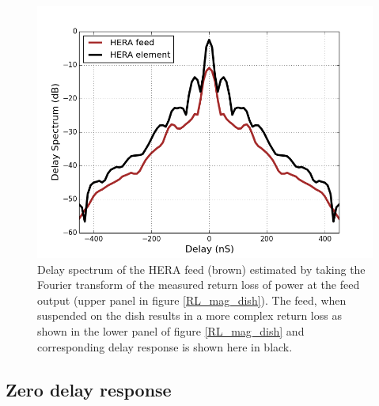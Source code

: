 \documentclass[twocolumn]{emulateapj}
\begin{document}
    \begin{figure}       
    \centering
    \includegraphics[width=\linewidth]{GB_reflectometry_part3/plot/ds_feed_dish.png}
    \caption{Delay spectrum of the HERA feed (brown) estimated by taking the Fourier transform of the measured return loss of power at the feed output (upper panel in figure \ref{RL_mag_dish}). The feed, when suspended on the dish results in a more complex return loss as shown in the lower panel of figure \ref{RL_mag_dish} and corresponding delay response is shown here in black. }
    \label{ds_feed_on_dish_trans}
    \end{figure}
    

    
    \subsection{Zero delay response}
    
\end{document}
